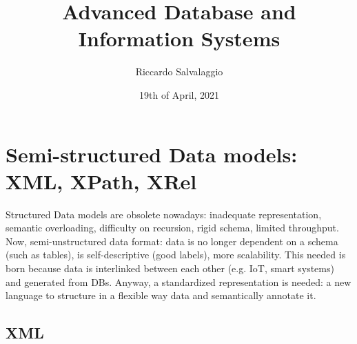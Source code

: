 \documentclass{article}
\title{Advanced Database and Information Systems}
\author{Riccardo Salvalaggio}
\date{19th of April, 2021}
\begin{document}
\maketitle
\newpage
\tableofcontents
\newpage

\section{Semi-structured Data models: XML, XPath, XRel}

Structured Data models are obsolete nowadays: inadequate representation, semantic overloading, difficulty on recursion, rigid schema, limited throughput.
Now, semi-unstructured data format: data is no longer dependent on a schema (such as tables), is self-descriptive (good labels), more scalability. This needed is born because data is interlinked between each other (e.g. IoT, smart systems) and generated from DBs.
Anyway, a standardized representation is needed: a new language to structure in a flexible way data and semantically annotate it.

\subsection{XML}
\end{document}
